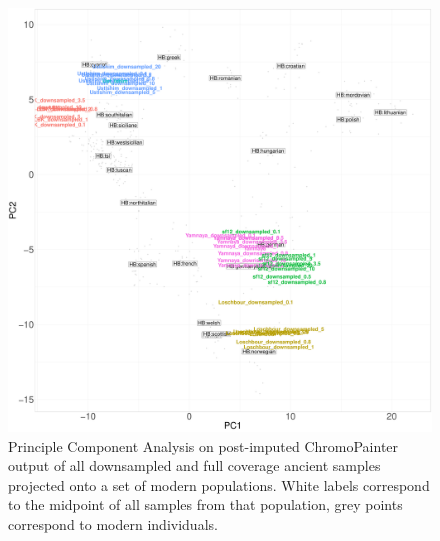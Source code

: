 \begin{figure}[htp]
    \centering
    \includegraphics[width=1.0\textwidth]{../images/chapter1/CP_linked_PCA.pdf}
    \caption{Principle Component Analysis on post-imputed ChromoPainter output of all downsampled and full coverage ancient samples projected onto a set of modern populations. White labels correspond to the midpoint of all samples from that population, grey points correspond to modern individuals.}
    \label{fig:CP_linked_PCA}
\end{figure}

